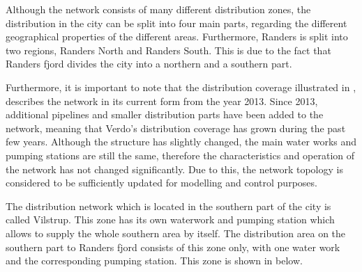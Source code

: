 Although the network consists of many different distribution zones, the distribution in the city can be split into four main parts, regarding the different geographical properties of the different areas. Furthermore, Randers is split into two regions, Randers North and Randers South. This is due to the fact that Randers fjord divides the city into a northern and a southern part\cite{verdo}. 

Furthermore, it is important to note that the distribution coverage illustrated in , describes the network in its current form from the year 2013. Since 2013, additional pipelines and smaller distribution parts have been added to the network, meaning that Verdo's distribution coverage has grown during the past few years. Although the structure has slightly changed, the main water works and pumping stations are still the same, therefore the characteristics and operation of the network has not changed significantly. Due to this, the network topology is considered to be sufficiently updated for modelling and control purposes. 

The distribution network which is located in the southern part of the city is called Vilstrup. This zone has its own waterwork and pumping station which allows to supply the whole southern area by itself. The distribution area on the southern part to Randers fjord consists of this zone only, with one water work and the corresponding pumping station. This zone is shown in  below.

